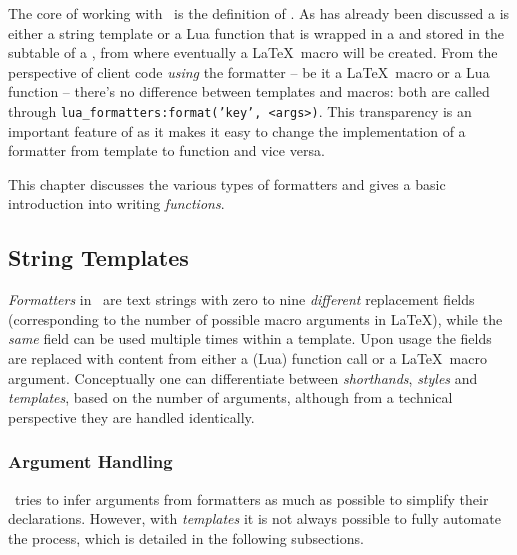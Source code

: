 \documentclass[12pt]{scrartcl}
\begin{document}
The core of working with \luaformatters\ is the definition of
.  As has already been discussed a 
is either a string template or a Lua function that is wrapped in a
 and stored in the  subtable of a
, from where eventually a \LaTeX\ macro will be created.
From the perspective of client code \emph{using} the formatter -- be it a
\LaTeX\ macro or a Lua function -- there's no difference between templates and
macros: both are called through \texttt{lua_formatters:format('key',
<args>)}.  This transparency is an important feature of \luaformatters
as it makes it easy to change the implementation of a formatter from template to
function and vice versa.

This chapter discusses the various types of formatters and gives a basic introduction into writing  \emph{functions}.


\subsection{String Templates}
\label{sec:usage:string-templates}

\emph{Formatters} in \luaformatters\ are text strings with zero to nine
\emph{different} replacement fields (corresponding to the number of possible
macro arguments in \LaTeX), while the \emph{same} field can be used multiple
times within a template.  Upon usage the fields are replaced with content from
either a (Lua) function call or a \LaTeX\ macro argument.  Conceptually one can
differentiate between \emph{shorthands}, \emph{styles} and \emph{templates},
based on the number of arguments, although from a technical perspective they are
handled identically.


\subsubsection{Argument Handling}
\label{sec:templates-argument-handling}

\luaformatters\ tries to infer arguments from formatters as much as
possible to simplify their declarations.  However, with \emph{templates} it is
not always possible to fully automate the process, which is detailed in the
following subsections.
\end{document}
